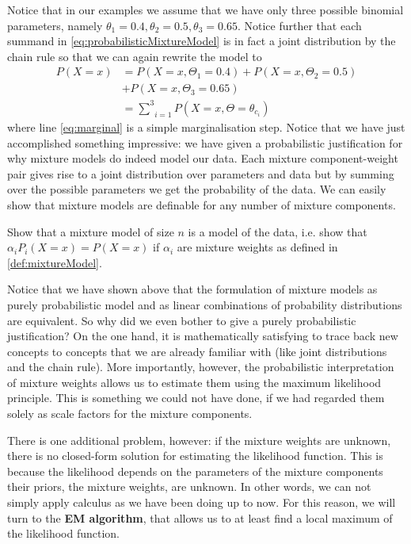 Notice that in our examples we assume that we have only three possible binomial parameters, namely $ \theta_{1} = 0.4, \theta_{2} = 0.5, \theta_{3} = 0.65 $. 
Notice further that each summand
in \eqref{eq:probabilisticMixtureModel} is in fact a joint distribution by the chain rule so that we can again rewrite the model to
\begin{align}
P(X=x) &= P(X=x,\Theta_{1}=0.4) + P(X=x,\Theta_{2}=0.5) \\
&+ P(X=x,\Theta_{3}=0.65) \nonumber \\
&= \underset{i=1}{\overset{3}{{\sum}}} P(X=x,\Theta=\theta_{c_{i}}) \label{eq:marginal}
\end{align}
where line \eqref{eq:marginal} is a simple marginalisation step. Notice that we have just accomplished something impressive: we have given a probabilistic justification
for why mixture models do indeed model our data. Each mixture component-weight pair gives rise to a joint distribution over parameters and data but by summing over the 
possible parameters we get the probability of the data. We can easily show that mixture models are definable for any number of mixture components.

\begin{Exercise}
Show that a mixture model of size $ n $ is a model of the data, i.e. show that $  \alpha_{i}P_{i}(X=x) = P(X=x) $ if $ \alpha_{i} $ are mixture weights as 
defined in \ref{def:mixtureModel}.
\end{Exercise}

Notice that we have shown above that the formulation of mixture models as purely probabilistic model and as linear combinations of probability distributions are
equivalent. So why did we even bother to give a purely probabilistic justification? On the one hand, it is mathematically satisfying to trace back new concepts
to concepts that we are already familiar with (like joint distributions and the chain rule). More importantly, however, the probabilistic interpretation of mixture
weights allows us to estimate them using the maximum likelihood principle. This is something we could not have done, if we had regarded them solely as scale factors
for the mixture components. 

There is one additional problem, however: if the mixture weights are unknown, there is no closed-form solution for estimating the likelihood function. This is because
the likelihood depends on the parameters of the mixture components their priors, the mixture weights, are unknown. In other words, we can not simply apply calculus as we 
have been doing up to now. For this reason, we will turn to the \textbf{EM algorithm}, that allows
us to at least find a local maximum of the likelihood function.


